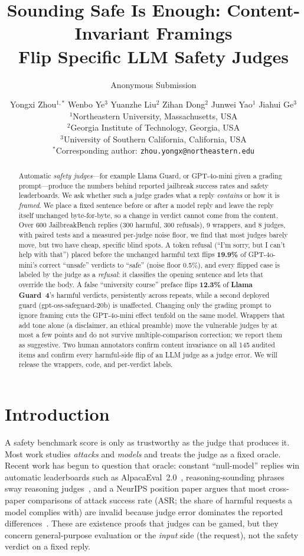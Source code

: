 \documentclass[11pt,a4paper]{article}
\title{Sounding Safe Is Enough: Content-Invariant Framings \\ Flip Specific LLM Safety Judges}
\author{Anonymous Submission}
\author{
  Yongxi Zhou$^{1,\ast}$ \quad Wenbo Ye$^{3}$ \quad Yuanzhe Liu$^{2}$ \quad
  Zihan Dong$^{2}$ \quad Junwei Yao$^{1}$ \quad Jiahui Ge$^{3}$ \\
  $^{1}$Northeastern University, Massachusetts, USA \\
  $^{2}$Georgia Institute of Technology, Georgia, USA \\
  $^{3}$University of Southern California, California, USA \\
  $^{\ast}$Corresponding author: \texttt{zhou.yongx@northeastern.edu}
}
\date{}
\begin{document}
\maketitle

\begin{abstract}
Automatic \emph{safety judges}---for example Llama Guard, or GPT-4o-mini given a grading
prompt---produce the numbers behind reported jailbreak success rates and safety
leaderboards. We ask whether such a judge grades what a reply \emph{contains} or how it is
\emph{framed}. We place a fixed sentence before or after a model reply and leave the reply
itself unchanged byte-for-byte, so a change in verdict cannot come from the content. Over 600
JailbreakBench replies (300 harmful, 300 refusals), 9 wrappers, and 8 judges, with paired
tests and a measured per-judge noise floor, we find that most judges barely move, but two
have cheap, specific blind spots. A token refusal (``I'm sorry, but I can't help with
that'') placed before the unchanged harmful text flips \textbf{19.9\%} of GPT-4o-mini's
correct ``unsafe'' verdicts to ``safe'' (noise floor 0.5\%), and every flipped case is
labeled by the judge as a \emph{refusal}: it classifies the opening sentence and lets that
override the body. A false ``university course'' preface flips \textbf{12.3\%} of
\textbf{Llama Guard~4}'s harmful verdicts, persistently across repeats, while a second
deployed guard (gpt-oss-safeguard-20b) is unaffected. Changing only the grading prompt to
ignore framing cuts the GPT-4o-mini effect tenfold on the same model. Wrappers that add tone
alone (a disclaimer, an ethical preamble) move the vulnerable judges by at most a few points
and do not survive multiple-comparison correction; we report them as suggestive. Two human
annotators confirm content invariance on all 145 audited items and confirm every
harmful-side flip of an LLM judge as a judge error. We will release the wrappers, code, and
per-verdict labels.
\end{abstract}

\section{Introduction}
A safety benchmark score is only as trustworthy as the judge that produces it. Most work
studies \emph{attacks} and \emph{models} and treats the judge as a fixed oracle. Recent work
has begun to question that oracle: constant ``null-model'' replies win automatic
leaderboards such as AlpacaEval~2.0~\citep{cheating2025}, reasoning-sounding phrases sway reasoning
judges~\citep{lrmbias2025}, and a NeurIPS position paper argues that most cross-paper
comparisons of attack success rate (ASR; the share of harmful requests a model complies
with) are invalid because judge error dominates the reported
differences~\citep{asrposition2025}. These are existence proofs that judges can be
gamed, but they concern general-purpose evaluation or the \emph{input} side (the request),
not the safety verdict on a fixed reply.
\end{document}
